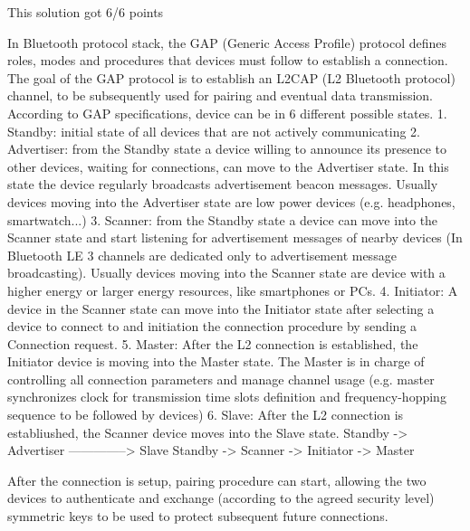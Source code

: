 \begin{solution}
    This solution got 6/6 points

    In Bluetooth protocol stack, the GAP (Generic Access Profile) protocol defines roles, modes and procedures that devices must follow to establish a connection. The goal of the GAP protocol is to establish an L2CAP (L2 Bluetooth protocol) channel, to be subsequently used for pairing and eventual data transmission. According to GAP specifications, device can be in 6 different possible states.
    1. Standby: initial state of all devices that are not actively communicating
    2. Advertiser: from the Standby state a device willing to announce its presence to other devices, waiting for connections, can move to the Advertiser state. In this state the device regularly broadcasts advertisement beacon messages. Usually devices moving into the Advertiser state are low power devices (e.g. headphones, smartwatch...)
    3. Scanner: from the Standby state a device can move into the Scanner state and start listening for advertisement messages of nearby devices (In Bluetooth LE 3 channels are dedicated only to advertisement message broadcasting). Usually devices moving into the Scanner state are device with a higher energy or larger energy resources, like smartphones or PCs.
    4. Initiator: A device in the Scanner state can move into the Initiator state after selecting a device to connect to and initiation the connection procedure by sending a Connection request.
    5. Master: After the L2 connection is established, the Initiator device is moving into the Master state. The Master is in charge of controlling all connection parameters and manage channel usage (e.g. master synchronizes clock for transmission time slots definition and frequency-hopping sequence to be followed by devices)
    6. Slave: After the L2 connection is establiushed, the Scanner device moves into the Slave state.
    Standby -> Advertiser --------------> Slave 
    Standby -> Scanner -> Initiator -> Master

    After the connection is setup, pairing procedure can start, allowing the two devices to authenticate and exchange (according to the agreed security level) symmetric keys to be used to protect subsequent future connections.


\end{solution}
